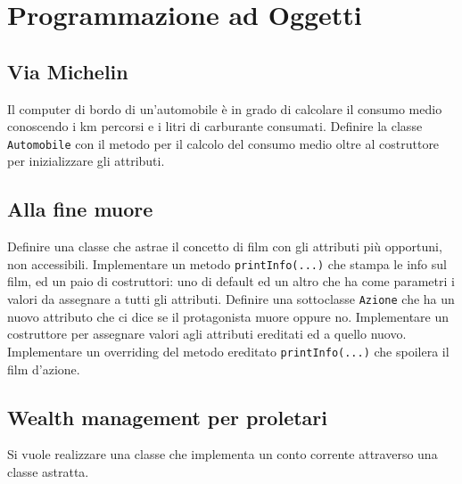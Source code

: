 \documentclass{article}
\begin{document}
\section{Programmazione ad Oggetti}
\subsection{Via Michelin}
Il computer di bordo di un’automobile è in grado di calcolare il consumo medio conoscendo i km percorsi e i litri di carburante consumati. 
Definire la classe \texttt{Automobile} con il metodo per il calcolo del consumo medio oltre al costruttore per inizializzare gli attributi.


\subsection{Alla fine muore}
Definire una classe che astrae il concetto di film con gli attributi più opportuni, non accessibili. 
Implementare un metodo \texttt{printInfo(...)} che stampa le info sul film, ed un paio di costruttori: uno di default ed un altro che ha come parametri i valori da assegnare a tutti gli attributi.
Definire una sottoclasse \texttt{Azione} che ha un nuovo attributo che ci dice se il protagonista muore oppure no. Implementare un costruttore per assegnare valori agli attributi ereditati ed a quello nuovo. 
Implementare un overriding del metodo ereditato \texttt{printInfo(...)} che spoilera il film d’azione. 


\subsection{Wealth management per proletari}
Si vuole realizzare una classe che implementa un conto corrente attraverso una classe astratta.
\end{document}
